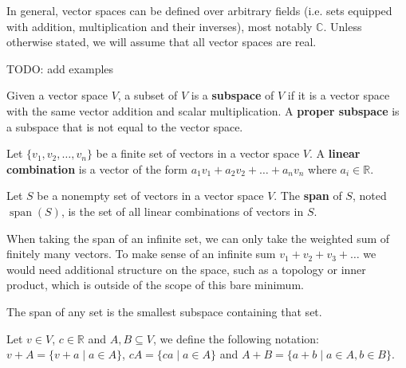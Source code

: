 \documentclass{bareminimum}
\DeclareMathOperator{\SPAN}{span}
\begin{document}
	\begin{remark}
		In general, vector spaces can be defined over arbitrary fields (i.e. sets equipped with addition, multiplication and their inverses), most notably $\mathbb{C}$. Unless otherwise stated, we will assume that all vector spaces are real.
	\end{remark}
	
	TODO: add examples
	
	\begin{defn}[Subspace]
		Given a vector space $V$,  a subset of $V$ is a \textbf{subspace} of $V$ if it is a vector space with the same vector addition and scalar multiplication. A \textbf{proper subspace} is a subspace that is not equal to the vector space.
	\end{defn}
	
	\begin{defn}
		Let $\{v_1, v_2, \dots, v_n\}$ be a finite set of vectors in a vector space $V$. A \textbf{linear combination} is a vector of the form $a_1 v_1 + a_2 v_2 + \ldots + a_n v_n$ where $a_i \in \mathbb{R}$.
	\end{defn}
	
	\begin{defn}[Span]
		Let $S$ be a nonempty set of vectors \marginleft{Span: $\SPAN(S)$} in a vector space $V$. The \textbf{span} of $S$, noted $\SPAN(S)$, is the set of all linear combinations of vectors in $S$.
	\end{defn}
	
	\begin{remark}
		When taking the span of an infinite set, we can only take the weighted sum of finitely many vectors. To make sense of an infinite sum $v_1 + v_2 + v_3 + \ldots$ we would need additional structure on the space, such as a topology or inner product, which is outside of the scope of this bare minimum.
	\end{remark}
	
	\begin{prop}
		The span of any set is the smallest subspace containing that set.
	\end{prop}
	
	\begin{remark}
		Let $v \in V$, $c \in \mathbb{R}$ and $A,B \subseteq V$, we define the following notation: $v + A = \{ v + a \mid a \in A \}$, $cA = \{ ca \mid a \in A \}$ and $A + B = \{ a + b \mid a \in A, b \in B \}$.
	\end{remark}
	
\end{document}
